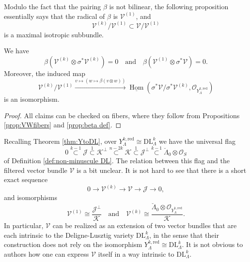 \documentclass[11pt]{alggeom}
\newcommand{\map}[1]{\xrightarrow{#1}}
\newcommand{\iso}{\cong}
\newcommand{\red}{\mathrm{red}}
\newcommand{\co}{\mathcal O}
\DeclareMathOperator{\Hom}{Hom}
\begin{document}
Modulo the fact that the pairing $\beta$ is not bilinear, the following proposition essentially says that the radical of $\beta$ is $\mathscr{V}^{(1)}$, and
\[
\mathscr{V}^{(k)}/ \mathscr{V}^{(1)}  \subset  \mathscr{V}/ \mathscr{V}^{(1)}
\]
 is a maximal isotropic subbundle.

\begin{proposition}\label{prop:beta isotropy}
We have 
\[
\beta( \mathscr{V}^{(k)}  \otimes \sigma^*\mathscr{V}^{(k)} ) =0 \quad\mbox{and}\quad \beta(\mathscr{V}^{(1)} \otimes \sigma^* \mathscr{V})=0.
\] 
Moreover,  the induced map
\[
\mathscr{V}^{(k)}/ \mathscr{V}^{(1)}  \map{ v \mapsto ( w \mapsto \beta(v\otimes w) ) }  \underline{\Hom}( \sigma^*   \mathscr{V} /  \sigma^*\mathscr{V}^{(k)}   , \co_{ Y_\Lambda^{k,\red} } )
\]
is an isomorphism.
\end{proposition}

\begin{proof}
All claims can be checked on fibers, where they follow from Propositions \ref{prop:VWfibers} and \ref{prop:beta def}.
\end{proof}







Recalling Theorem \ref{thm:YtoDL}, over  $Y^{k,\red}_\Lambda \iso \mathrm{DL}_\Lambda^k$ we have the universal flag 
\[
0 \stackrel{k-1}{\subset}  \mathscr{J} \stackrel{1}{\subset} \mathscr{K}^\perp 
\stackrel{n-2k}{\subset}      \mathscr{K} \stackrel{1}{\subset} \mathscr{J}^\perp \stackrel{k-1}{\subset}
 \breve{\Lambda}_0 \otimes \co_S
\]
of Definition \ref{def:non-minuscule DL}.
The relation between this flag and the filtered vector bundle $\mathscr{V}$
is a bit unclear.  
 It is not hard to see that there is a short exact sequence
\[
0 \to  \mathscr{V}^{(k)} \to \mathscr{V} \to \mathscr{J} \to 0,
\]
and  isomorphisms
\[
\mathscr{V}^{(1)} \iso  
\frac{  \mathscr{J}^\perp }{  \mathscr{K} } 
\quad\mbox{and} \quad    \mathscr{V}^{(k)} \iso \frac{ \breve{\Lambda}_0 \otimes \co_{Y^{k,\red}_\Lambda}}{  \mathscr{K} }.
\]
In particular,  $\mathscr{V}$ can be realized as an extension of two vector bundles that are each intrinsic to the Deligne-Lusztig variety $\mathrm{DL}_\Lambda^k$, in the sense that their construction does not rely on the isomorphism $Y^{k,\red}_\Lambda \iso \mathrm{DL}_\Lambda^k$.  It is not obvious to authors how one can express $\mathscr{V}$ itself in a way intrinsic to 
$\mathrm{DL}_\Lambda^k$.
\end{document}
